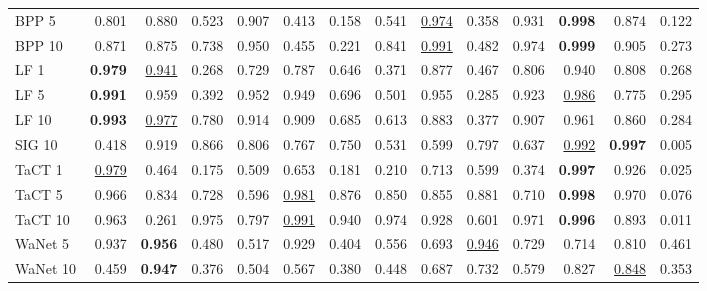 \begin{table}[htbp]
\begin{adjustbox}{max width=\textwidth}
\begin{tabular}{lrrrrrrrrrrrrr}
BPP 5 & 0.801 & 0.880 & 0.523 & 0.907 & \textcolor{black!45}{0.413} & \textcolor{black!45}{0.158} & 0.541 & \underline{0.974} & \textcolor{black!45}{0.358} & 0.931 & \textbf{0.998} & 0.874 & \textcolor{black!45}{0.122} \\
BPP 10 & 0.871 & 0.875 & 0.738 & 0.950 & \textcolor{black!45}{0.455} & \textcolor{black!45}{0.221} & 0.841 & \underline{0.991} & \textcolor{black!45}{0.482} & 0.974 & \textbf{0.999} & 0.905 & \textcolor{black!45}{0.273} \\
LF 1 & \textbf{0.979} & \underline{0.941} & \textcolor{black!45}{0.268} & 0.729 & 0.787 & 0.646 & \textcolor{black!45}{0.371} & 0.877 & \textcolor{black!45}{0.467} & 0.806 & 0.940 & 0.808 & \textcolor{black!45}{0.268} \\
LF 5 & \textbf{0.991} & 0.959 & \textcolor{black!45}{0.392} & 0.952 & 0.949 & 0.696 & 0.501 & 0.955 & \textcolor{black!45}{0.285} & 0.923 & \underline{0.986} & 0.775 & \textcolor{black!45}{0.295} \\
LF 10 & \textbf{0.993} & \underline{0.977} & 0.780 & 0.914 & 0.909 & 0.685 & 0.613 & 0.883 & \textcolor{black!45}{0.377} & 0.907 & 0.961 & 0.860 & \textcolor{black!45}{0.284} \\
SIG 10 & \textcolor{black!45}{0.418} & 0.919 & 0.866 & 0.806 & 0.767 & 0.750 & 0.531 & 0.599 & 0.797 & 0.637 & \underline{0.992} & \textbf{0.997} & \textcolor{black!45}{0.005} \\
TaCT 1 & \underline{0.979} & \textcolor{black!45}{0.464} & \textcolor{black!45}{0.175} & 0.509 & 0.653 & \textcolor{black!45}{0.181} & \textcolor{black!45}{0.210} & 0.713 & 0.599 & \textcolor{black!45}{0.374} & \textbf{0.997} & 0.926 & \textcolor{black!45}{0.025} \\
TaCT 5 & 0.966 & 0.834 & 0.728 & 0.596 & \underline{0.981} & 0.876 & 0.850 & 0.855 & 0.881 & 0.710 & \textbf{0.998} & 0.970 & \textcolor{black!45}{0.076} \\
TaCT 10 & 0.963 & \textcolor{black!45}{0.261} & 0.975 & 0.797 & \underline{0.991} & 0.940 & 0.974 & 0.928 & 0.601 & 0.971 & \textbf{0.996} & 0.893 & \textcolor{black!45}{0.011} \\
WaNet 5 & 0.937 & \textbf{0.956} & \textcolor{black!45}{0.480} & 0.517 & 0.929 & \textcolor{black!45}{0.404} & 0.556 & 0.693 & \underline{0.946} & 0.729 & 0.714 & 0.810 & \textcolor{black!45}{0.461} \\
WaNet 10 & \textcolor{black!45}{0.459} & \textbf{0.947} & \textcolor{black!45}{0.376} & 0.504 & 0.567 & \textcolor{black!45}{0.380} & \textcolor{black!45}{0.448} & 0.687 & 0.732 & 0.579 & 0.827 & \underline{0.848} & \textcolor{black!45}{0.353} \\

\end{tabular}
\end{adjustbox}
\end{table}

